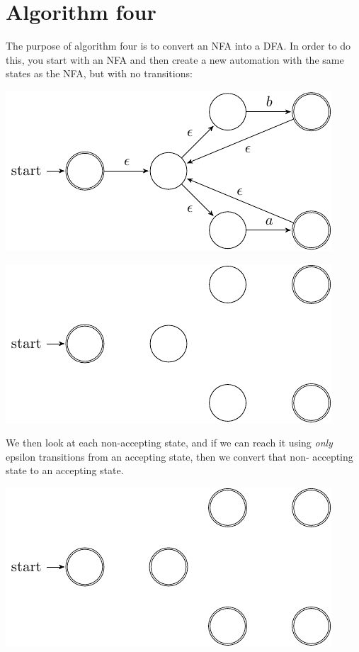 \section{Algorithm four}

The purpose of algorithm four is to convert an NFA into a DFA. In order to do
this, you start with an NFA and then create a new automation with the same
states as the NFA, but with no transitions:

\begin{center}
  \includegraphics{automata/22.pdf}
\end{center}

\begin{center}
  \includegraphics{automata/23.pdf}
\end{center}

We then look at each non-accepting state, and if we can reach it using {\it
only} epsilon transitions from an accepting state, then we convert that non-
accepting state to an accepting state.

\begin{center}
  \includegraphics{automata/24.pdf}
\end{center}

